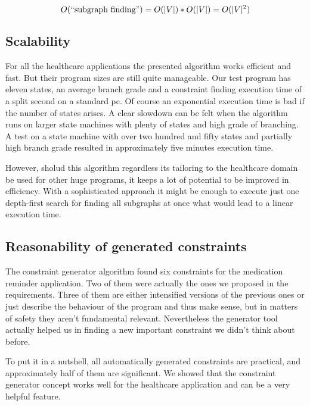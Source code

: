 \begin{equation}
O(\textnormal{``subgraph finding''})=O(|V|)*O(|V|)=O(|V|^2)
\end{equation}



\subsection{Scalability}

For all the healthcare applications the presented algorithm works efficient and fast. But their program sizes are still quite manageable. Our test program has eleven states, an average branch grade and a constraint finding execution time of a split second on a standard pc.
Of course an exponential execution time is bad if the number of states arises. A clear slowdown can be felt when the algorithm runs on larger state machines with plenty of states and high grade of branching. A test on a state machine with over two hundred and fifty states and partially high branch grade resulted in approximately five minutes execution time.

However, sholud this algorithm regardless its tailoring to the healthcare domain be used for other huge programs, it keeps a lot of potential to be improved in efficiency. With a sophisticated approach it might be enough to execute just one depth-first search for finding all subgraphs at once what would lead to a linear execution time.



\subsection{Reasonability of generated constraints}

The constraint generator algorithm found six constraints for the medication reminder application. Two of them were actually the ones we proposed in the requirements. Three of them are either intensified versions of the previous ones or just describe the behaviour of the program and thus make sense, but in matters of safety they aren't fundamental relevant.
Nevertheless the generator tool actually helped us in finding a new important constraint we didn't think about before.

To put it in a nutshell, all automatically generated constraints are practical, and approximately half of them are significant. We showed that the constraint generator concept works well for the healthcare application and can be a very helpful feature.




